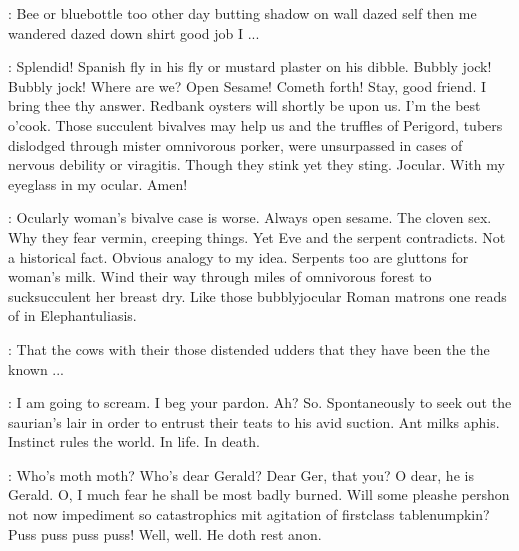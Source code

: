 \Bloom:
Bee or bluebottle too other day butting shadow on wall dazed self
then me wandered dazed down shirt good job I ...%

\Virag:
Splendid!
Spanish fly in his fly or mustard plaster on his dibble.
Bubbly jock! Bubbly jock!
Where are we?
Open Sesame!
Cometh forth!
Stay, good friend.
I bring thee thy answer.
Redbank oysters will shortly
be upon us.
I'm the best o'cook.
Those succulent bivalves may help us and
the truffles of Perigord, tubers dislodged through mister omnivorous porker,
were unsurpassed in cases of nervous debility or viragitis.
Though they stink yet they sting.
Jocular.
With my eyeglass in my ocular.
Amen!

\Bloom:
Ocularly woman's bivalve case is worse.
Always open sesame.
The cloven sex.
Why they fear vermin, creeping things.
Yet Eve and the serpent contradicts.
Not a historical fact.
Obvious analogy to my idea.
Serpents too are gluttons for woman's milk.
Wind their way through miles of omnivorous forest to sucksucculent her breast dry.
Like those bubblyjocular Roman matrons one reads of in Elephantuliasis.

\Virag:
That the cows with their those distended udders
that they have been the the known ...

\Bloom:
I am going to scream.
I beg your pardon.
Ah? So.
Spontaneously to seek out the saurian's lair in order to
entrust their teats to his avid suction.
Ant milks aphis.
Instinct rules the world.
In life.
In death.

\Virag:
Who's moth moth?
Who's dear Gerald?
Dear Ger, that you?
O dear, he is Gerald.
O, I much fear he shall be most badly burned.
Will some pleashe pershon not now impediment
so catastrophics mit agitation of firstclass tablenumpkin?
Puss puss puss puss!
Well, well.
He doth rest anon.

